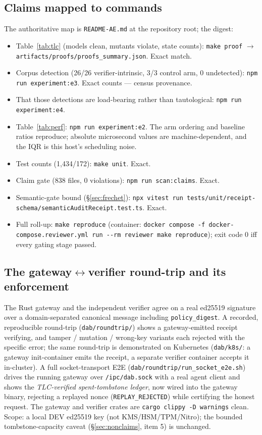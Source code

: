 \documentclass[10pt,twocolumn,letterpaper]{article}
\newcommand{\evthreeintrinsic}{26/26}   %
\newcommand{\evthreecontrol}{3/3}       %
\newcommand{\evthreeundetected}{0}
\newcommand{\testcount}{1{,}434}
\newcommand{\testfiles}{172}
\newcommand{\claimfiles}{838}
\begin{document}
\subsection{Claims mapped to commands}
The authoritative map is \texttt{README-AE.md} at the repository root; the
digest:
\begin{itemize}
\item Table~\ref{tab:tlc} (models clean, mutants violate, state counts):
  \texttt{make proof} $\rightarrow$
  \texttt{artifacts/proofs/proofs\_summary.json}. Exact match.
\item Corpus detection (\evthreeintrinsic{} verifier-intrinsic,
  \evthreecontrol{} control arm, \evthreeundetected{} undetected):
  \texttt{npm run experiment:e3}. Exact counts --- census provenance.
\item That those detections are load-bearing rather than tautological:
  \texttt{npm run experiment:e4}.
\item Table~\ref{tab:perf}: \texttt{npm run experiment:e2}. The arm ordering
  and baseline ratios reproduce; absolute microsecond values are
  machine-dependent, and the IQR is this host's scheduling noise.
\item Test counts (\testcount{}/\testfiles{}): \texttt{make unit}. Exact.
\item Claim gate (\claimfiles{} files, 0 violations):
  \texttt{npm run scan:claims}. Exact.
\item Semantic-gate bound (\S\ref{sec:frechet}):
  \texttt{npx vitest run
  tests/unit/receipt-schema/semanticAuditReceipt.test.ts}. Exact.
\item Full roll-up: \texttt{make reproduce} (container:
  \texttt{docker compose -f docker-compose.reviewer.yml run -{}-rm reviewer
  make reproduce}); exit code 0 iff every gating stage passed.
\end{itemize}

\subsection{The gateway$\leftrightarrow$verifier round-trip and its enforcement}
The Rust gateway and the independent verifier agree on a real ed25519
signature over a domain-separated canonical message including
\texttt{policy\_digest}. A recorded, reproducible round-trip
(\texttt{dab/roundtrip/}) shows a gateway-emitted receipt verifying, and
tamper / mutation / wrong-key variants each rejected with the specific error;
the same round-trip is demonstrated on Kubernetes (\texttt{dab/k8s/}: a gateway
init-container emits the receipt, a separate verifier container accepts it
in-cluster). A full socket-transport E2E
(\texttt{dab/roundtrip/run\_socket\_e2e.sh}) drives the running gateway over
\texttt{/ipc/dab.sock} with a real agent client and shows the
\emph{TLC-verified spent-tombstone ledger}, now wired into the gateway binary,
rejecting a replayed nonce (\texttt{REPLAY\_REJECTED}) while certifying the
honest request. The gateway and verifier crates are
\texttt{cargo clippy -D warnings} clean. Scope: a local DEV ed25519 key
(not KMS/HSM/TPM/Nitro); the bounded tombstone-capacity caveat
(\S\ref{sec:nonclaims}, item 5) is unchanged.
\end{document}
